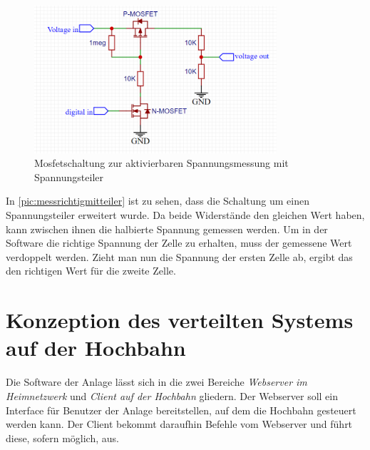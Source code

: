 \begin{figure}[h]
	\begin{center}
		\includegraphics[width=9cm]{messMitTeiler.PNG}
		\caption{\label{pic:messrichtigmitteiler} Mosfetschaltung zur aktivierbaren Spannungsmessung mit Spannungsteiler}
	\end{center}
\end{figure}
\newpage
In \autoref{pic:messrichtigmitteiler} ist zu sehen, dass die Schaltung um einen Spannungsteiler erweitert wurde. Da beide Widerstände den gleichen Wert haben, kann zwischen ihnen die halbierte Spannung gemessen werden. 
Um in der Software die richtige Spannung der Zelle zu erhalten, muss der gemessene Wert verdoppelt werden. Zieht man nun die Spannung der ersten Zelle ab, ergibt das den richtigen Wert für die zweite Zelle.

\chapter{Konzeption des verteilten Systems auf der Hochbahn}
\label{sec:software}
Die Software der Anlage lässt sich in die zwei Bereiche \textit{Webserver im Heimnetzwerk} und \textit{Client auf der Hochbahn} gliedern. Der Webserver soll ein Interface für Benutzer der Anlage bereitstellen, auf dem die Hochbahn gesteuert werden kann. 
Der Client bekommt daraufhin Befehle vom Webserver und führt diese, sofern möglich, aus. 

